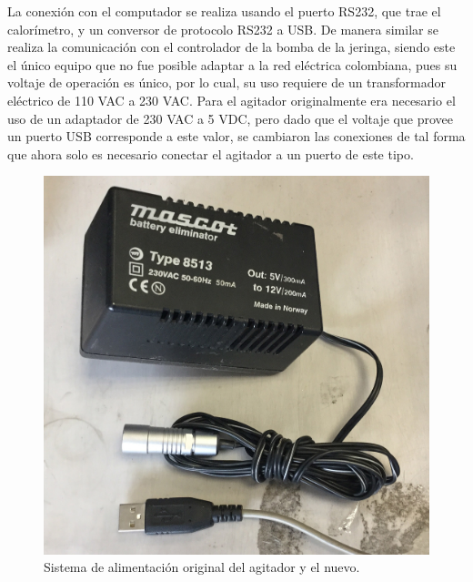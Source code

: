 	La conexión con el computador se realiza usando el puerto RS232, que trae el calorímetro, y un conversor de protocolo RS232 a USB. De manera similar se realiza la comunicación con el controlador de la bomba de la jeringa, siendo este el único equipo que no fue posible adaptar a la red eléctrica colombiana, pues su voltaje de operaci\'on es \'unico, por lo cual, su uso requiere de un transformador eléctrico de 110 VAC a 230 VAC. Para el agitador originalmente era necesario el uso de un adaptador de 230 VAC a 5 VDC, pero dado que el voltaje que provee un puerto USB corresponde a este valor, se cambiaron las conexiones de tal forma que ahora solo es necesario conectar el agitador a un puerto de este tipo.
	\begin{figure}[h]
		\centering
		\includegraphics[width=0.5\linewidth]{Figures/motorCircuit}
		\caption{Sistema de alimentaci\'on original del agitador y el nuevo.}
	\end{figure}
	
